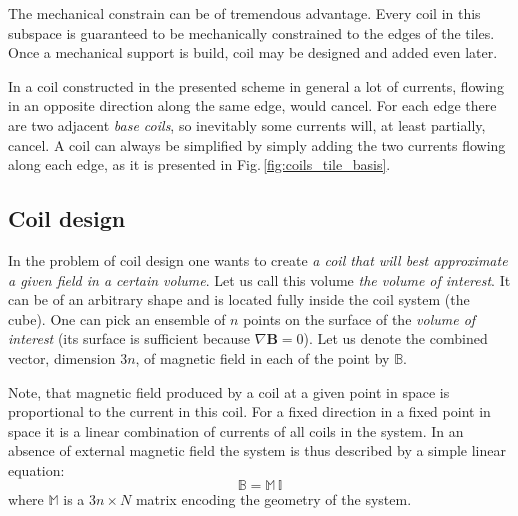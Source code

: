 The mechanical constrain can be of tremendous advantage. Every coil in this subspace is guaranteed to be mechanically constrained to the edges of the tiles. Once a mechanical support is build, coil may be designed and added even later.

In a coil constructed in the presented scheme in general a lot of currents, flowing in an opposite direction along the same edge, would cancel. For each edge there are two adjacent \emph{base coils}, so inevitably some currents will, at least partially, cancel. A coil can always be simplified by simply adding the two currents flowing along each edge, as it is presented in Fig.\,\ref{fig:coils_tile_basis}.


\subsection{Coil design}
In the problem of coil design one wants to create \emph{a coil that will best approximate a given field in a certain volume}. Let us call this volume \emph{the volume of interest}. It can be of an arbitrary shape and is located fully inside the coil system (the cube). One can pick an ensemble of $n$ points on the surface of the \emph{volume of interest} (its surface is sufficient because $\nabla \mathbf{B} = 0$). Let us denote the combined vector, dimension $3n$, of magnetic field in each of the point by $\mathbb{B}$.


Note, that magnetic field produced by a coil at a given point in space is proportional to the current in this coil. For a fixed direction in a fixed point in space it is a linear combination of currents of all coils in the system. In an absence of external magnetic field the system is thus described by a simple linear equation:
\begin{equation}
  \mathbb{B} = \mathbb{M} \, \mathbb{I}
\end{equation}
where $\mathbb{M}$ is a $3n \times N$ matrix encoding the geometry of the system.

